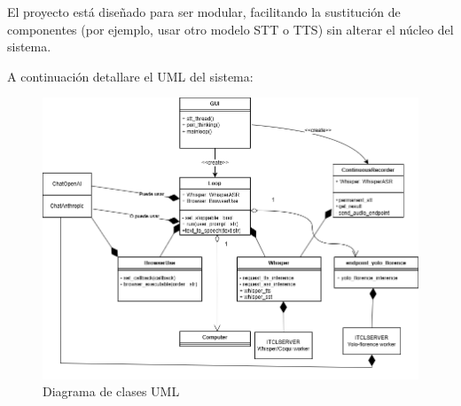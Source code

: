 El proyecto está diseñado para ser modular, facilitando la sustitución de componentes (por ejemplo, usar otro modelo STT o TTS) sin alterar el núcleo del sistema.

A continuación detallare el UML del sistema:

\begin{figure}[h!]
  \includegraphics[scale=0.45]{img/Diagrama_clases.drawio.png}
  \caption{Diagrama de clases UML}
  \label{fig:UML}
\end{figure}

